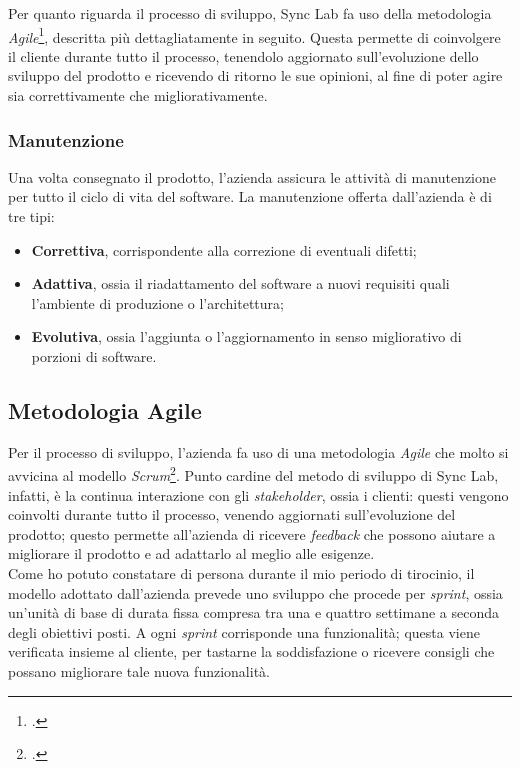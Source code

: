 Per quanto riguarda il processo di sviluppo, Sync Lab fa uso della metodologia \textit{Agile}\footcite{tec:agile}, descritta più dettagliatamente in seguito. Questa permette di coinvolgere il cliente durante tutto il processo, tenendolo aggiornato sull'evoluzione dello sviluppo del prodotto e ricevendo di ritorno le sue opinioni, al fine di poter agire sia correttivamente che migliorativamente.

\subsubsection*{Manutenzione}

Una volta consegnato il prodotto, l'azienda assicura le attività di manutenzione per tutto il ciclo di vita del software. La manutenzione offerta dall'azienda è di tre tipi:
\begin{itemize}
  \item \textbf{Correttiva}, corrispondente alla correzione di eventuali difetti;
  \item \textbf{Adattiva}, ossia il riadattamento del software a nuovi requisiti quali l'ambiente di produzione o l'architettura;
  \item \textbf{Evolutiva}, ossia l'aggiunta o l'aggiornamento in senso migliorativo di porzioni di software.
\end{itemize}

\subsection{Metodologia Agile}

Per il processo di sviluppo, l'azienda fa uso di una metodologia \textit{Agile} che molto si avvicina al modello \textit{Scrum}\footcite{tec:scrum}. Punto cardine del metodo di sviluppo di Sync Lab, infatti, è la continua interazione con gli \textit{stakeholder}, ossia i clienti: questi vengono coinvolti durante tutto il processo, venendo aggiornati sull'evoluzione del prodotto; questo permette all'azienda di ricevere \textit{feedback} che possono aiutare a migliorare il prodotto e ad adattarlo al meglio alle esigenze. \\
Come ho potuto constatare di persona durante il mio periodo di tirocinio, il modello adottato dall'azienda prevede uno sviluppo che procede per \textit{sprint}, ossia un'unità di base di durata fissa compresa tra una e quattro settimane a seconda degli obiettivi posti. A ogni \textit{sprint} corrisponde una funzionalità; questa viene verificata insieme al cliente, per tastarne la soddisfazione o ricevere consigli che possano migliorare tale nuova funzionalità. \\

